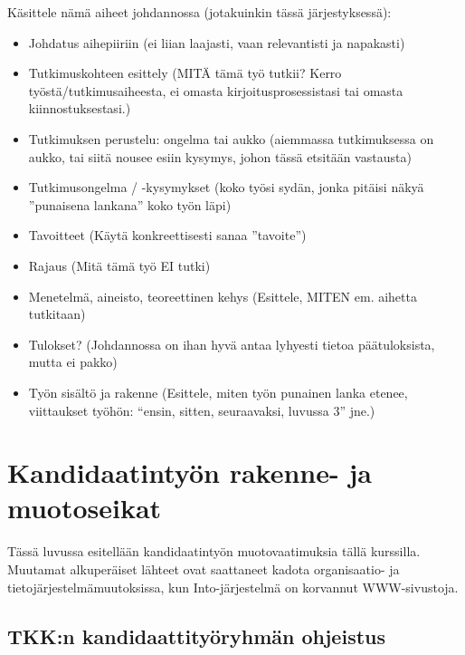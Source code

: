 Käsittele nämä aiheet johdannossa (jotakuinkin tässä järjestyksessä):
%
\begin{itemize}
 \item Johdatus aihepiiriin 
(ei liian laajasti, vaan relevantisti ja napakasti)
%
 \item Tutkimuskohteen esittely (MITÄ tämä työ tutkii? 
Kerro työstä/tutkimusaiheesta, ei omasta kirjoitusprosessistasi 
tai omasta kiinnostuksestasi.)
%
 \item Tutkimuksen perustelu: ongelma tai aukko 
(aiemmassa tutkimuksessa on aukko, tai siitä nousee esiin 
kysymys, johon tässä etsitään vastausta)
%
 \item Tutkimusongelma / -kysymykset (koko työsi sydän, 
jonka pitäisi näkyä ''punaisena lankana'' koko työn läpi)
 \item Tavoitteet (Käytä konkreettisesti sanaa ''tavoite'')
 \item Rajaus (Mitä tämä työ EI tutki)
 \item Menetelmä, aineisto, teoreettinen kehys (Esittele, 
MITEN em. aihetta tutkitaan)
 \item Tulokset? (Johdannossa on ihan hyvä antaa lyhyesti 
tietoa päätuloksista, mutta ei pakko)
 \item Työn sisältö ja rakenne (Esittele, miten työn punainen 
lanka etenee, viittaukset työhön: 
``ensin, sitten, seuraavaksi, luvussa 3'' jne.)
\end{itemize}



\section{Kandidaatintyön rakenne- ja muotoseikat}
\label{sec:esimluku}

Tässä luvussa esitellään kandidaatintyön muotovaatimuksia
tällä kurssilla. Muutamat alkuperäiset lähteet ovat saattaneet
kadota organisaatio- ja tietojärjestelmämuutoksissa, kun
Into-järjestelmä on korvannut WWW-sivustoja.

\subsection{TKK:n kandidaattityöryhmän ohjeistus}

